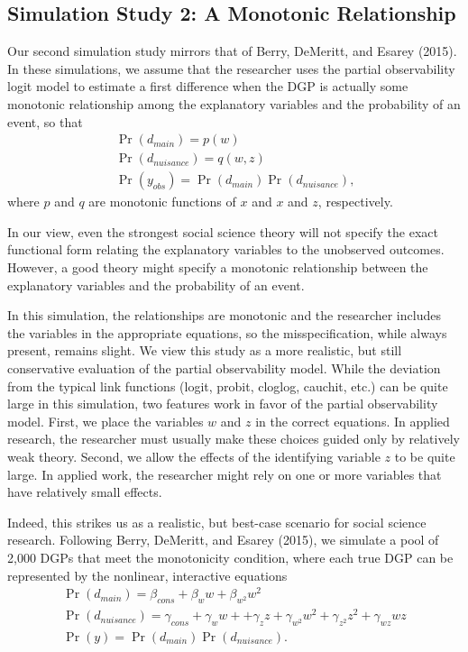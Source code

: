 \documentclass[10pt]{article}
\begin{document}
\subsection*{Simulation Study 2: A Monotonic Relationship}

Our second simulation study mirrors that of Berry, DeMeritt, and Esarey (2015). 
In these simulations, we assume that the researcher uses the partial observability logit model to estimate a first difference when the DGP is actually some monotonic relationship among the explanatory variables and the probability of an event, so that 
\begin{gather*}
\Pr(d_{main}) = p(w)\nonumber\\
\Pr(d_{nuisance}) = q(w, z) \nonumber\\
\Pr(y_{obs}) = \Pr(d_{main})\Pr(d_{nuisance})\text{,}\nonumber
\end{gather*}
where $p$ and $q$ are monotonic functions of $x$ and $x$ and $z$, respectively.

In our view, even the strongest social science theory will not specify the exact functional form relating the explanatory variables to the unobserved outcomes. 
However, a good theory might specify a monotonic relationship between the explanatory variables and the probability of an event.

In this simulation, the relationships are monotonic and the researcher includes the variables in the appropriate equations, so the misspecification, while always present, remains slight. 
We view this study as a more realistic, but still conservative evaluation of the partial observability model.
While the deviation from the typical link functions (logit, probit, cloglog, cauchit, etc.) can be quite large in this simulation, two features work in favor of the partial observability model. 
First, we place the variables $w$ and $z$ in the correct equations. 
In applied research, the researcher must usually make these choices guided only by relatively weak theory.
Second, we allow the effects of the identifying variable $z$ to be quite large.
In applied work, the researcher might rely on one or more variables that have relatively small effects.
 
Indeed, this strikes us as a realistic, but best-case scenario for social science research. 
Following Berry, DeMeritt, and Esarey (2015), we simulate a pool of 2,000 DGPs that meet the monotonicity condition, where each true DGP can be represented by the nonlinear, interactive equations
\begin{gather*}
\Pr(d_{main}) = \beta_{cons} + \beta_w w + \beta_{w^2} w^2 \\
\Pr(d_{nuisance}) = \gamma_{cons} + \gamma_w w + + \gamma_z z + \gamma_{w^2} w^2 + \gamma_{z^2} z^2 + \gamma_{wz} wz \\
\Pr(y) = \Pr(d_{main})\Pr(d_{nuisance})\text{.}
\end{gather*}
\end{document}
